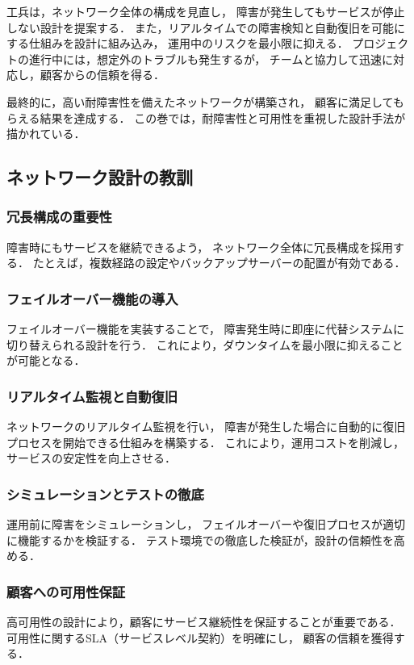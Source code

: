 \documentclass[titlepage,a4paper]{jsarticle}
\begin{document}
工兵は，ネットワーク全体の構成を見直し，
障害が発生してもサービスが停止しない設計を提案する．
また，リアルタイムでの障害検知と自動復旧を可能にする仕組みを設計に組み込み，
運用中のリスクを最小限に抑える．
プロジェクトの進行中には，想定外のトラブルも発生するが，
チームと協力して迅速に対応し，顧客からの信頼を得る．

最終的に，高い耐障害性を備えたネットワークが構築され，
顧客に満足してもらえる結果を達成する．
この巻では，耐障害性と可用性を重視した設計手法が描かれている．

\subsection{ネットワーク設計の教訓}
\subsubsection{冗長構成の重要性}
障害時にもサービスを継続できるよう，
ネットワーク全体に冗長構成を採用する．
たとえば，複数経路の設定やバックアップサーバーの配置が有効である．

\subsubsection{フェイルオーバー機能の導入}
フェイルオーバー機能を実装することで，
障害発生時に即座に代替システムに切り替えられる設計を行う．
これにより，ダウンタイムを最小限に抑えることが可能となる．

\subsubsection{リアルタイム監視と自動復旧}
ネットワークのリアルタイム監視を行い，
障害が発生した場合に自動的に復旧プロセスを開始できる仕組みを構築する．
これにより，運用コストを削減し，サービスの安定性を向上させる．

\subsubsection{シミュレーションとテストの徹底}
運用前に障害をシミュレーションし，
フェイルオーバーや復旧プロセスが適切に機能するかを検証する．
テスト環境での徹底した検証が，設計の信頼性を高める．

\subsubsection{顧客への可用性保証}
高可用性の設計により，顧客にサービス継続性を保証することが重要である．
可用性に関するSLA（サービスレベル契約）を明確にし，
顧客の信頼を獲得する．
\end{document}
